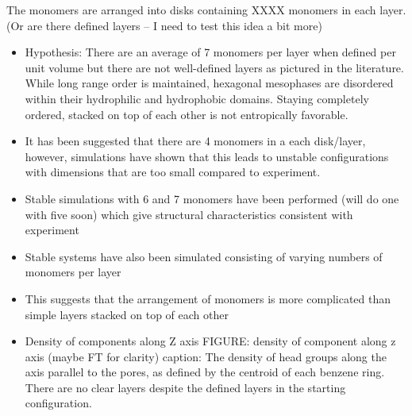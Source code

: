 \documentclass{article}
\begin{document}
	The monomers are arranged into disks containing XXXX monomers in each layer. (Or are there defined layers -- I need to test this idea a bit more) 
	\begin{itemize}
		\item Hypothesis: There are an average of 7 monomers per layer when defined per unit volume but there are not well-defined layers as pictured in the literature. While long range order is maintained, hexagonal mesophases are disordered within their hydrophilic and hydrophobic domains. Staying completely ordered, stacked on top of each other is not entropically favorable.
	        \item It has been suggested that there are 4 monomers in a each disk/layer, however, simulations have shown that this leads to unstable configurations with dimensions that are too small compared to experiment.
                \item Stable simulations with 6 and 7 monomers have been performed (will do one with five soon) which give structural characteristics consistent with experiment
                \item Stable systems have also been simulated consisting of varying numbers of monomers per layer
                \item This suggests that the arrangement of monomers is more complicated than simple layers stacked on top of each other
		\item Density of components along Z axis
	        FIGURE: density of component along z axis (maybe FT for clarity)
	        caption: The density of head groups along the axis parallel to the pores, as defined by the centroid of each benzene ring. There are no clear layers despite the defined layers in the starting configuration.

	\end{itemize}
\end{document}
